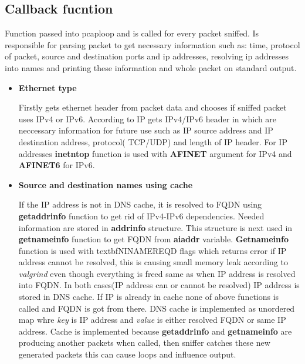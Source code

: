 \documentclass{article}
\begin{document}
\subsection{Callback fucntion}
Function passed into pcap\textunderscore loop and is called for every packet sniffed. Is responsible for parsing packet to get necessary information such as: time, protocol of packet, source and destination ports and ip addresses, resolving ip addresses into names and printing these information and whole packet on standard output.
\begin{itemize}
 	\item \textbf{Ethernet type} \newline
 	
 	Firstly gets ethernet header from packet data and chooses if sniffed packet uses IPv4 or IPv6. According to IP gets IPv4/IPv6 header in which are neccessary information for future use such as IP source address and IP destination address, protocol( TCP/UDP) and length of IP header. For IP addresses \textbf{inet\textunderscore ntop} function is used with \textbf{AF\textunderscore INET} argument for IPv4 and \textbf{AF\textunderscore INET6} for IPv6.
 	
	\item \textbf{Source and destination names using cache} \newline
	
	If the IP address is not in DNS cache, it is resolved to FQDN using \textbf{getaddrinfo} function to get rid of IPv4-IPv6 dependencies. Needed information are stored in \textbf{addrinfo} structure. This structure is next used in \textbf{getnameinfo} function to get FQDN from \textbf{ai\textunderscore addr} variable. \textbf{Getnameinfo} function is used with textbf{NI\textunderscore NAMEREQD} flags which returns error if IP address cannot be resolved, this is causing small memory leak according to \textit{valgrind} even though everything is freed same as when IP address is resolved into FQDN. In both cases(IP address can or cannot be resolved) IP address is stored in DNS cache. If IP is already in cache none of above functions is called and FQDN is got from there.
	DNS cache is implemented as unordered map whre \textit{key} is IP address and \textit{value} is either resolved FQDN or same IP address. Cache is implemented because \textbf{getaddrinfo} and \textbf{getnameinfo} are producing another packets when called, then sniffer catches these new generated packets this can cause loops and influence output. 
	\newpage
	

\end{itemize}
\end{document}
